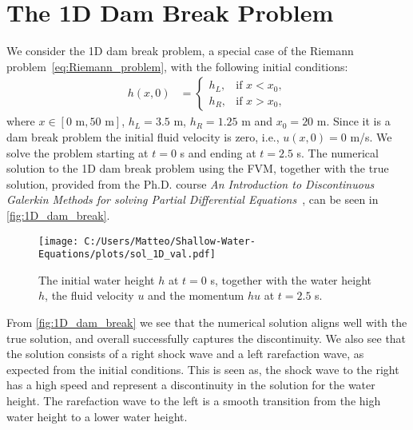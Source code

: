 \section{The 1D Dam Break Problem}\label{sec:1D_dam_break}
We consider the 1D dam break problem, a special case of the Riemann problem~\eqref{eq:Riemann_problem}, with the following initial conditions:
\begin{align*}
    h(x,0) &= \begin{cases}
        h_L, & \text{if } x < x_0, \\
        h_R, & \text{if } x > x_0,
    \end{cases} 
\end{align*}
where $x \in [0 \text{ m}, 50 \text{ m}]$, $h_L = 3.5$ m, $h_R = 1.25$ m and $x_0 = 20$ m.
Since it is a dam break problem the initial fluid velocity is zero, i.e., $u(x,0) = 0$ m/s.
We solve the problem starting at $t=0$ s and ending at $t=2.5$ s.
The numerical solution to the 1D dam break problem using the FVM, together with the true solution, provided from the Ph.D. course \textit{An Introduction to Discontinuous Galerkin Methods for solving Partial Differential Equations}~\cite{phd_corse_2009}, can be seen in \autoref{fig:1D_dam_break}.
\begin{figure}[H]
    \centering
    \texttt{[image: C:/Users/Matteo/Shallow-Water-Equations/plots/sol\_1D\_val.pdf]}
    \caption{The initial water height $h$ at $t=0$ s, together with the water height $h$, the fluid velocity $u$ and the momentum $hu$ at $t=2.5$ s.}\label{fig:1D_dam_break}
\end{figure}
From \autoref{fig:1D_dam_break} we see that the numerical solution aligns well with the true solution, and overall successfully captures the discontinuity.
We also see that the solution consists of a right shock wave and a left rarefaction wave, as expected from the initial conditions.
This is seen as, the shock wave to the right has a high speed and represent a discontinuity in the solution for the water height.
The rarefaction wave to the left is a smooth transition from the high water height to a lower water height.

